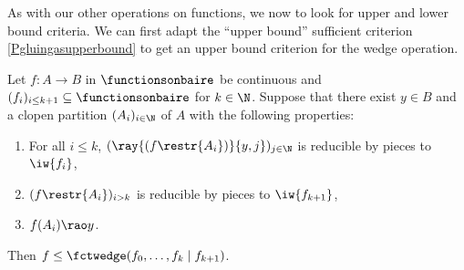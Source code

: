 As with our other operations on functions, we now to look for upper and lower bound criteria.
We can first adapt the ``upper bound'' sufficient criterion \cref{Pgluingasupperbound} to get an upper bound criterion for the wedge operation.


\begin{proposition}\label{Wedgeasupperbound}
Let $f:A\to B$ in $\functionsonbaire$ be continuous and $(f_i)_{i\leq k+1}\subseteq \functionsonbaire$ for $k\in \N$.
Suppose that there exist $y\in B$ and a clopen partition $(A_i)_{i\in\N}$ of $A$ with the following properties:
\begin{enumerate}
\item For all $i\leq k$, $(\ray{(f\restr{A_i})}{y,j})_{j\in \N}$ is reducible by pieces to $\iw{f_i}$,
\item $(f\restr{A_i})_{i>k}$ is reducible by pieces to $\iw{f_{k+1}}$,
\item $f(A_i)\rao y$.
\end{enumerate}
Then $f\leq\fctwedge (f_0,\ldots,f_{k}\mid f_{k+1})$.
\end{proposition}
